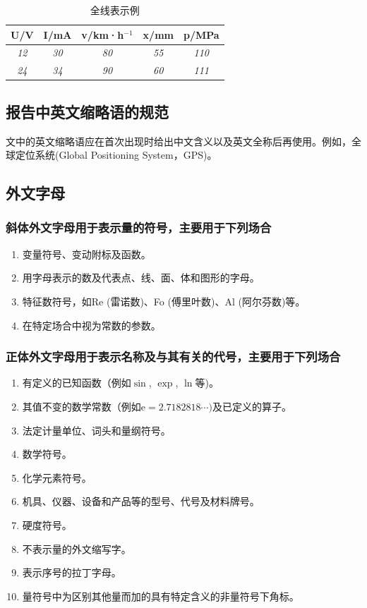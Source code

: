\documentclass{thuemp}
\begin{document}
\begin{table}[h]
\centering
\captionnamefont{\wuhao\bf\heiti}
\captiontitlefont{\wuhao\bf\heiti}
\caption{全线表示例} \label{tab:eg2}
\liuhao
\begin{tabular}{|c|c|c|c|c|}
\hline
U/V & I/mA & v/km·h$^{-1}$ & x/mm & p/MPa \\ \hline
\textit{12} & \textit{30} & \textit{80} & \textit{55} & \textit{110} \\ \hline
\textit{24} & \textit{34} & \textit{90} & \textit{60} & \textit{111} \\ \hline
\end{tabular}
\end{table}

\subsection{报告中英文缩略语的规范}
文中的英文缩略语应在首次出现时给出中文含义以及英文全称后再使用。例如，全球定位系统(Global Positioning System，GPS)。


\subsection{外文字母}
\subsubsection{斜体外文字母用于表示量的符号，主要用于下列场合}

\begin{enumerate}
\renewcommand{\labelenumi}{(\theenumi)}
\item 变量符号、变动附标及函数。
\item 用字母表示的数及代表点、线、面、体和图形的字母。
\item 特征数符号，如Re (雷诺数)、Fo (傅里叶数)、Al (阿尔芬数)等。
\item 在特定场合中视为常数的参数。
\end{enumerate} 

\subsubsection{正体外文字母用于表示名称及与其有关的代号，主要用于下列场合}
\begin{enumerate}
\renewcommand{\labelenumi}{(\theenumi)}
\item 有定义的已知函数（例如$\sin$, $\exp$, $\ln$等)。
\item 其值不变的数学常数（例如$\mathrm{e} = 2.718 281 8\cdots)$及已定义的算子。
\item 法定计量单位、词头和量纲符号。
\item 数学符号。
\item 化学元素符号。
\item 机具、仪器、设备和产品等的型号、代号及材料牌号。
\item 硬度符号。
\item 不表示量的外文缩写字。
\item 表示序号的拉丁字母。
\item 量符号中为区别其他量而加的具有特定含义的非量符号下角标。
\end{enumerate} 
\end{document}
